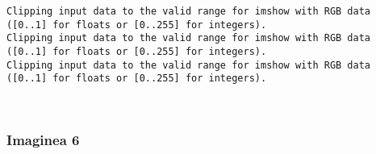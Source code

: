 \documentclass[11pt]{article}
\begin{document}
    \begin{Verbatim}[commandchars=\\\{\}]
Clipping input data to the valid range for imshow with RGB data ([0..1] for floats or [0..255] for integers).
Clipping input data to the valid range for imshow with RGB data ([0..1] for floats or [0..255] for integers).
Clipping input data to the valid range for imshow with RGB data ([0..1] for floats or [0..255] for integers).

    \end{Verbatim}

    \begin{center}
    \end{center}
    { \hspace*{\fill} \\}
    
    \subsubsection{Imaginea 6}\label{imaginea-6}
\end{document}

